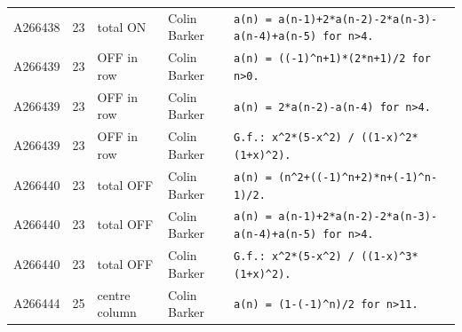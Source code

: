 \documentclass[11pt]{article}
\theoremstyle{definition}
\theoremstyle{remark}
\begin{document}
{\begin{longtable}{p{1.3cm}p{0.7cm}p{2.4cm}p{2.3cm}p{7.3cm}}
A266438 & 23 & total ON & Colin Barker & \texttt{a(n)\allowbreak{} \allowbreak{}=\allowbreak{} \allowbreak{}a(n-\allowbreak{}1)\allowbreak{}+\allowbreak{}2*\allowbreak{}a(n-\allowbreak{}2)\allowbreak{}-\allowbreak{}2*\allowbreak{}a(n-\allowbreak{}3)\allowbreak{}-\allowbreak{}a(n-\allowbreak{}4)\allowbreak{}+\allowbreak{}a(n-\allowbreak{}5)\allowbreak{} \allowbreak{}for \allowbreak{}n>4.} \\
A266439 & 23 & OFF in row & Colin Barker & \texttt{a(n)\allowbreak{} \allowbreak{}=\allowbreak{} \allowbreak{}((-\allowbreak{}1)\allowbreak{}\^{}n+\allowbreak{}1)\allowbreak{}*\allowbreak{}(2*\allowbreak{}n+\allowbreak{}1)\allowbreak{}/\allowbreak{}2 \allowbreak{}for \allowbreak{}n>0.} \\
A266439 & 23 & OFF in row & Colin Barker & \texttt{a(n)\allowbreak{} \allowbreak{}=\allowbreak{} \allowbreak{}2*\allowbreak{}a(n-\allowbreak{}2)\allowbreak{}-\allowbreak{}a(n-\allowbreak{}4)\allowbreak{} \allowbreak{}for \allowbreak{}n>4.} \\
A266439 & 23 & OFF in row & Colin Barker & \texttt{G.f.: \allowbreak{}x\^{}2*\allowbreak{}(5-\allowbreak{}x\^{}2)\allowbreak{} \allowbreak{}/\allowbreak{} \allowbreak{}((1-\allowbreak{}x)\allowbreak{}\^{}2*\allowbreak{}(1+\allowbreak{}x)\allowbreak{}\^{}2)\allowbreak{}.} \\
A266440 & 23 & total OFF & Colin Barker & \texttt{a(n)\allowbreak{} \allowbreak{}=\allowbreak{} \allowbreak{}(n\^{}2+\allowbreak{}((-\allowbreak{}1)\allowbreak{}\^{}n+\allowbreak{}2)\allowbreak{}*\allowbreak{}n+\allowbreak{}(-\allowbreak{}1)\allowbreak{}\^{}n-\allowbreak{}1)\allowbreak{}/\allowbreak{}2.} \\
A266440 & 23 & total OFF & Colin Barker & \texttt{a(n)\allowbreak{} \allowbreak{}=\allowbreak{} \allowbreak{}a(n-\allowbreak{}1)\allowbreak{}+\allowbreak{}2*\allowbreak{}a(n-\allowbreak{}2)\allowbreak{}-\allowbreak{}2*\allowbreak{}a(n-\allowbreak{}3)\allowbreak{}-\allowbreak{}a(n-\allowbreak{}4)\allowbreak{}+\allowbreak{}a(n-\allowbreak{}5)\allowbreak{} \allowbreak{}for \allowbreak{}n>4.} \\
A266440 & 23 & total OFF & Colin Barker & \texttt{G.f.: \allowbreak{}x\^{}2*\allowbreak{}(5-\allowbreak{}x\^{}2)\allowbreak{} \allowbreak{}/\allowbreak{} \allowbreak{}((1-\allowbreak{}x)\allowbreak{}\^{}3*\allowbreak{}(1+\allowbreak{}x)\allowbreak{}\^{}2)\allowbreak{}.} \\
A266444 & 25 & centre column & Colin Barker & \texttt{a(n)\allowbreak{} \allowbreak{}=\allowbreak{} \allowbreak{}(1-\allowbreak{}(-\allowbreak{}1)\allowbreak{}\^{}n)\allowbreak{}/\allowbreak{}2 \allowbreak{}for \allowbreak{}n>11.} \\

\end{longtable}}
\end{document}
